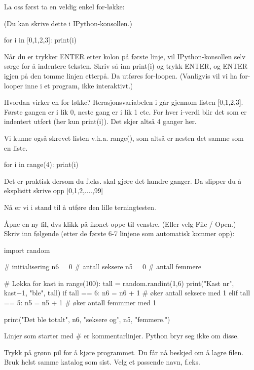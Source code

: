 La oss først ta en veldig enkel for-løkke:

(Du kan skrive dette i IPython-konsollen.) 

\begin{usncodebox}
for i in [0,1,2,3]:
    print(i)
\end{usncodebox}

Når du er trykker ENTER etter kolon på første linje, vil IPython-konsollen selv sørge for å indentere teksten. Skriv så inn print(i) og trykk ENTER, og ENTER igjen på den tomme linjen etterpå. Da utføres for-loopen. (Vanligvis vil vi ha for-looper inne i et program, ikke interaktivt.)

Hvordan virker en for-løkke? Iterasjonsvariabelen i går gjennom listen [0,1,2,3]. Første gangen er i lik 0, neste gang er i lik 1 etc. For hver i-verdi blir det som er indentert utført (her kun print(i)). Det skjer altså 4 ganger her. 

Vi kunne også skrevet listen v.h.a. range(), som altså er nesten det samme som en liste.
\begin{usncodebox}
for i in range(4): 
    print(i)
\end{usncodebox}

Det er praktisk dersom du f.eks. skal gjøre det hundre ganger. Da slipper du å eksplisitt skrive opp [0,1,2,....,99]

Nå er vi i stand til å utføre den lille terningtesten. 

Åpne en ny fil, dvs klikk på ikonet oppe til venstre. (Eller velg File / Open.) Skriv inn følgende (etter de første 6-7 linjene som automatisk kommer opp): 

\begin{usncodebox}
import random

# initialisering
n6 = 0  # antall seksere
n5 = 0  # antall femmere

# Løkka 
for kast in range(100):
    tall = random.randint(1,6)
    print("Kast nr", kast+1, "ble", tall)
    if tall == 6:
       n6 = n6 + 1    # øker antall seksere med 1
    elif tall == 5:
       n5 = n5 + 1    # øker antall femmmer med 1

print("Det ble totalt", n6, "seksere og", n5, "femmere.")
\end{usncodebox}

Linjer som starter med \# er kommentarlinjer. Python bryr seg ikke om disse. 

Trykk på grønn pil for å kjøre programmet. Du får nå beskjed om å lagre filen. Bruk helst samme katalog som sist. Velg et passende navn, f.eks. 

